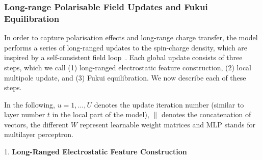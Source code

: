 \documentclass[aps,%
superscriptaddress,
 amsmath,amssymb,
floatfix,
twocolumn
]{revtex4-2}
\begin{document}
\subsubsection{Long-range Polarisable Field Updates and Fukui Equilibration}

In order to capture polarisation effects and long-range charge transfer, the model performs a series of long-ranged updates to the spin-charge density, which are inspired by a self-consistent field loop~\cite{Baldwin2026SCF}. Each global update consists of three steps, which we call (1) long-ranged electrostatic feature construction, (2) local multipole update, and (3) Fukui equilibration. We now describe each of these steps.

In the following, $u=1,...,U$ denotes the update iteration number (similar to layer number $t$ in the local part of the model), $\|$ denotes the concatenation of vectors, the different $W$ represent learnable weight matrices and MLP stands for multilayer perceptron.

1. \textbf{Long-Ranged Electrostatic Feature Construction} 
\end{document}
